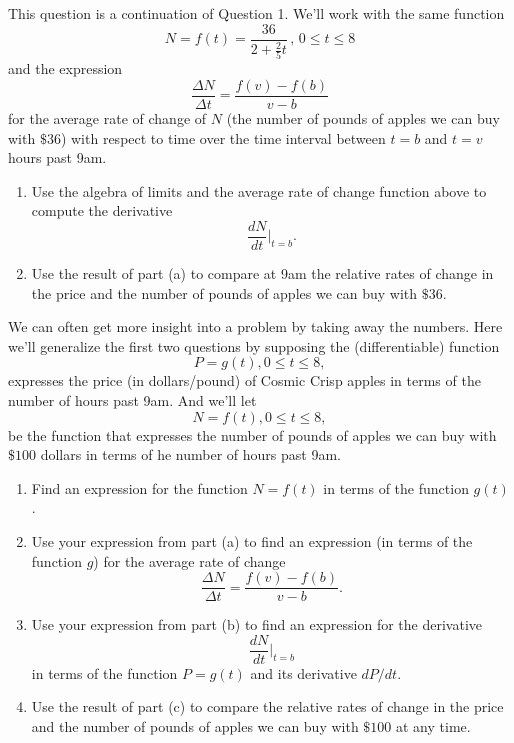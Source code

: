 \documentclass{ximera}
\begin{document}
\begin{question} \label{Q09fdfgsgg}
This question is a continuation of Question 1. We'll work with the same function
\[
     N = f(t) = \frac{36}{2 + \frac{2}{5}t} \, , \, 0\leq t \leq 8
\]
and the expression
\[
 \frac{\Delta N}{\Delta t} = \frac{f(v)-f(b)}{v-b}
\]
for the average rate of change of $N$ (the number of pounds of apples we can buy with $\$36$) with respect to time over the time interval between $t=b$ and $t=v$ hours past 9am.

\begin{enumerate}
\item Use the algebra of limits and the average rate of change function above to compute the derivative
\[
  \frac{dN}{dt}\Big|_{t=b} .
\]

\item Use the result of part (a) to compare at 9am the relative rates of change in the price and the number of pounds of apples we can buy with $\$36$. 

\end{enumerate}
\end{question}

\begin{question}  \label{Qopdfpdsgnbhtr}
We can often get more insight into a problem by taking away the numbers. Here we'll generalize the first two questions by supposing the (differentiable) function
\[
         P = g(t) , 0\leq t \leq 8 ,
\]
expresses the price (in dollars/pound) of Cosmic Crisp apples in terms of the number of hours past 9am. And we'll let
\[
          N = f(t) , 0\leq t \leq 8 ,
\]
be the function that expresses the number of pounds of apples we can buy with $\$100$ dollars in terms of he number of hours past 9am.

\begin{enumerate}
\item Find an expression for the function $N=f(t)$ in terms of the function $g(t)$.

\item Use your expression from part (a) to find an expression (in terms of the function $g$) for the average rate of change
\[
 \frac{\Delta N}{\Delta t} = \frac{f(v)-f(b)}{v-b} .
\]

\item Use your expression from part (b) to find an expression for the derivative
\[
  \frac{dN}{dt}\Big|_{t=b} 
\]
in terms of the function $P=g(t)$ and its derivative $dP/dt$.

\item Use the result of part (c) to compare the  relative rates of change in the price and the number of pounds of apples we can buy with $\$100$ at any time. 
\end{enumerate}


\end{question}
\end{document}
